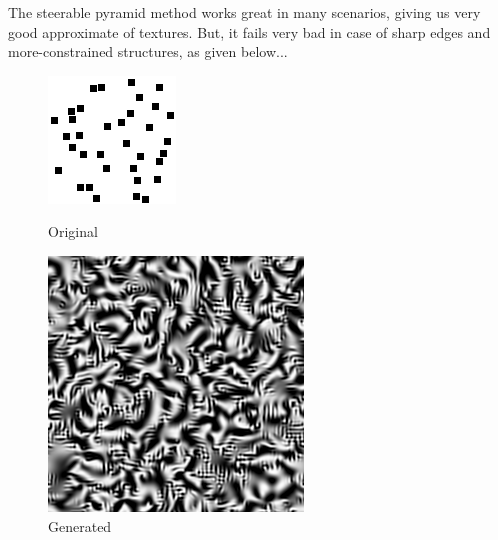 \documentclass{article}
\begin{document}
\pagebreak
The steerable pyramid method works great in many scenarios, giving us very good approximate of textures. But, it fails very bad in case of sharp edges and more-constrained structures, as given below...\\

    \begin{figure}[!htb]
    \begin{center}
      \includegraphics[scale=.3]{5/report/steerable/16.png}
      \caption{Original}
    \end{center}
    \endminipage \hfill
    \begin{center}
      \includegraphics[scale=.3]{5/report/steerable/16_c.png}
      \caption{Generated}
    \end{center}
    \endminipage
    \end{figure} 
\end{document}
